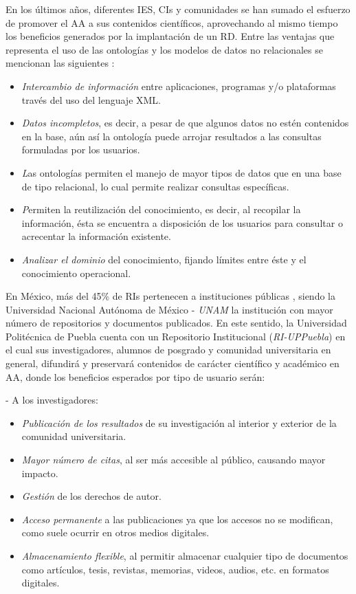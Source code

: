 En los \'ultimos a\~{n}os, diferentes IES, CIs y comunidades se han sumado el esfuerzo de promover el AA a sus contenidos cient\'ificos, aprovechando al mismo tiempo los beneficios generados por la implantaci\'on de un RD. Entre las ventajas que representa el uso de las ontolog\'ias y los modelos de datos no relacionales se mencionan las siguientes \cite{ASWebQuest} \cite{GuideCreatingOntology}:

\begin{itemize}
\item \textit{Intercambio de informaci\'on} entre aplicaciones, programas y/o plataformas trav\'es del uso del lenguaje XML.
\item \textit{Datos incompletos}, es decir, a pesar de que algunos datos no est\'en contenidos en la base, a\'un as\'i la ontolog\'ia puede arrojar resultados a las consultas formuladas por los usuarios.
\item \textit Las ontolog\'ias permiten el manejo de mayor {tipos de datos} que en una base de tipo relacional, lo cual permite realizar consultas espec\'ificas.
\item \textit Permiten la {reutilizaci\'on del conocimiento}, es decir, al recopilar la informaci\'on, \'esta se encuentra a disposici\'on de los usuarios para consultar o acrecentar la informaci\'on existente.
\item \textit{Analizar el dominio }del conocimiento, fijando l\'imites entre \'este y el conocimiento operacional.
\end{itemize}

En M\'exico, m\'as del 45\% de RIs pertenecen a instituciones p\'ublicas \cite{RI_REMERI}, siendo la Universidad Nacional Aut\'onoma de M\'exico - \textit{UNAM} la instituci\'on con mayor n\'umero de repositorios y documentos publicados. En este sentido, la Universidad Polit\'ecnica de Puebla cuenta con un Repositorio Institucional (\textit{RI-UPPuebla}) en el cual sus investigadores, alumnos de posgrado y comunidad universitaria en general, difundir\'a y preservar\'a contenidos de car\'acter cient\'ifico y acad\'emico en AA, donde los beneficios esperados por tipo de usuario ser\'an:

- A los investigadores: 
	\begin{itemize}
	\item \textit{Publicaci\'on de los resultados} de su investigaci\'on al interior y exterior de la comunidad universitaria.
    \item \textit{Mayor n\'umero de citas}, al ser m\'as accesible al p\'ublico, causando mayor impacto.
    \item \textit{Gesti\'on} de los derechos de autor.
    \item \textit{Acceso permanente} a las publicaciones ya que los accesos no se modifican, como suele ocurrir en otros medios digitales.
    \item \textit{Almacenamiento flexible}, al permitir almacenar cualquier tipo de documentos como art\'iculos, tesis, revistas, memorias, videos, audios, etc. en formatos digitales.
	\end{itemize}
	
